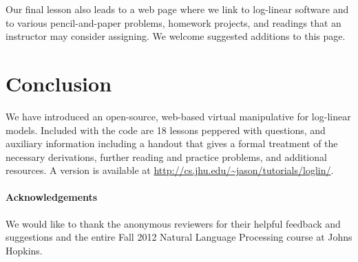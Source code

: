 \documentclass[11pt,letterpaper]{article}
\newcommand{\Note}[1]{}
\renewcommand{\Note}[1]{\hl{[#1]}}  %
\newcommand{\NoteSigned}[3]{{\sethlcolor{#2}\Note{#1: #3}}}
\newcommand{\NoteFF}[1]{\NoteSigned{FF}{LightBlue}{#1}}
\newcommand{\WhereToFind}[0]{\url{http://cs.jhu.edu/~jason/tutorials/loglin/}}
\newcommand{\NumLessons}[0]{18}%
\begin{document}


Our final lesson also leads to a web page where we link to log-linear
software and to various pencil-and-paper problems, homework projects,
and readings that an instructor may consider assigning.  We welcome
suggested additions to this page.


\section{Conclusion}
We have introduced an open-source, web-based virtual manipulative for
log-linear models. Included with the code are
\NumLessons{} lessons peppered with questions, and auxiliary 
information including a handout that gives a formal treatment of the necessary 
derivations, further reading and practice problems, and additional resources.
A version is available at \WhereToFind{}.


\paragraph*{Acknowledgements}
We would like to thank the anonymous reviewers for their helpful feedback and suggestions 
and the entire Fall 2012 Natural Language Processing course at 
Johns Hopkins.




\end{document}
